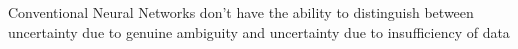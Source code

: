 \documentclass[preview]{standalone}
\begin{document}
\begin{center}
Conventional Neural Networks don't have the ability to distinguish between uncertainty due to genuine ambiguity and uncertainty due to insufficiency of data
\end{center}
\end{document}
